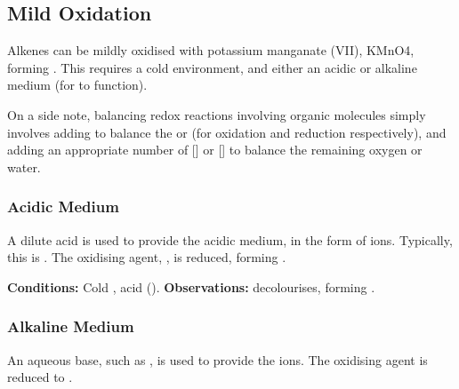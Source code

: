 
	\pagebreak
	\subsection{Mild Oxidation}

		Alkenes can be mildly oxidised with potassium manganate (VII), KMnO4, forming . This requires a cold environment,
		and either an acidic or alkaline medium (for  to function).

		On a side note, balancing redox reactions involving organic molecules simply involves adding  to balance the
		 or  (for oxidation and reduction respectively), and adding an appropriate number of [] or []
		to balance the remaining oxygen or water.


		\subsubsection{Acidic Medium}

		A dilute acid is used to provide the acidic medium, in the form of  ions. Typically, this is . The oxidising
		agent, , is reduced, forming .

		\vspace{1.5em}
		\vbox{\textbf{Conditions:}	\tabto{35mm}Cold , acid ().}
		\vbox{\textbf{Observations:}  decolourises, forming .}





		\subsubsection{Alkaline Medium}

		An aqueous base, such as , is used to provide the  ions. The oxidising agent  is reduced to
		.

